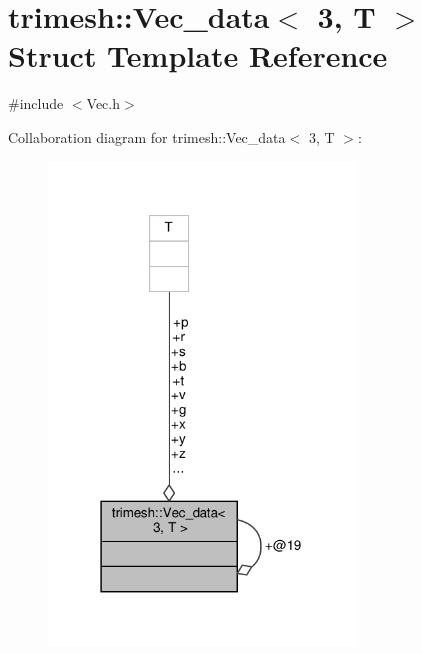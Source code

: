 \hypertarget{structtrimesh_1_1Vec__data_3_013_00_01T_01_4}{}\section{trimesh\+:\+:Vec\+\_\+data$<$ 3, T $>$ Struct Template Reference}
\label{structtrimesh_1_1Vec__data_3_013_00_01T_01_4}


{\ttfamily \#include $<$Vec.\+h$>$}



Collaboration diagram for trimesh\+:\+:Vec\+\_\+data$<$ 3, T $>$\+:\nopagebreak
\begin{figure}[H]
\begin{center}
\leavevmode
\includegraphics[width=231pt]{d6/d90/structtrimesh_1_1Vec__data_3_013_00_01T_01_4__coll__graph}
\end{center}
\end{figure}
